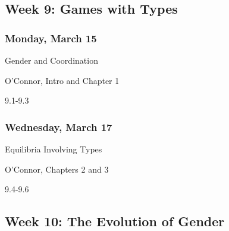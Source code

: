 \documentclass[
]{article}
\providecommand{\tightlist}{%
  \setlength{\itemsep}{0pt}\setlength{\parskip}{0pt}}
\begin{document}
\newpage

\hypertarget{week-9-games-with-types}{%
\subsection{Week 9: Games with Types}\label{week-9-games-with-types}}

\begin{multicols}{2}

\hypertarget{monday-march-15}{%
\subsubsection{Monday, March 15}\label{monday-march-15}}

\begin{description}
\tightlist
\item[Topic]
Gender and Coordination
\item[Reading]
O'Connor, Intro and Chapter 1
\item[Lectures]
9.1-9.3
\end{description}

\hypertarget{wednesday-march-17}{%
\subsubsection{Wednesday, March 17}\label{wednesday-march-17}}

\begin{description}
\tightlist
\item[Topic]
Equilibria Involving Types
\item[Reading]
O'Connor, Chapters 2 and 3
\item[Lectures]
9.4-9.6
\end{description}

\end{multicols}

\hypertarget{week-10-the-evolution-of-gender}{%
\subsection{Week 10: The Evolution of
Gender}\label{week-10-the-evolution-of-gender}}
\end{document}
